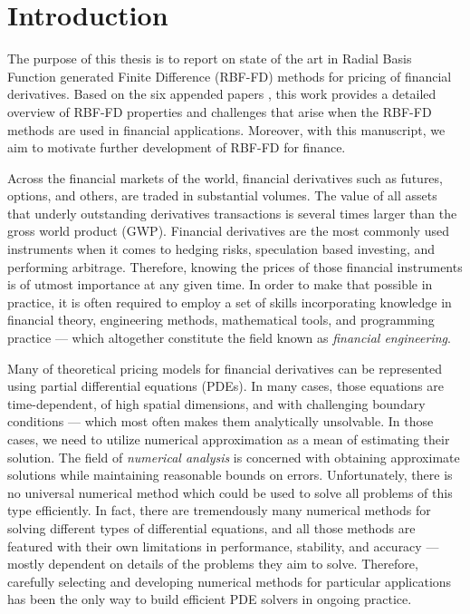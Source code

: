 \documentclass{UUThesisTemplate}
\begin{document}
\chapter{Introduction}
\label{ch:introduction}
\par The purpose of this thesis is to report on state of the art in Radial Basis Function generated Finite Difference (RBF-FD) methods for pricing of financial derivatives. Based on the six appended papers \cite{paper1,paper2,paper3,paper4,paper5,paper6}, this work provides a detailed overview of RBF-FD properties and challenges that arise when the RBF-FD methods are used in financial applications. Moreover, with this manuscript, we aim to motivate further development of RBF-FD for finance.
\par Across the financial markets of the world, financial derivatives such as futures, options, and others, are traded in substantial volumes. The value of all assets that underly outstanding derivatives transactions is several times larger than the gross world product (GWP). Financial derivatives are the most commonly used instruments when it comes to hedging risks, speculation based investing, and performing arbitrage. Therefore, knowing the prices of those financial instruments is of utmost importance at any given time. In order to make that possible in practice, it is often required to employ a set of skills incorporating knowledge in financial theory, engineering methods, mathematical tools, and programming practice --- which altogether constitute the field known as \emph{financial engineering}. 
\par Many of theoretical pricing models for financial derivatives can be represented using partial differential equations (PDEs). In many cases, those equations are time-dependent, of high spatial dimensions, and with challenging boundary conditions --- which most often makes them analytically unsolvable. In those cases, we need to utilize numerical approximation as a mean of estimating their solution. The field of \emph{numerical analysis} is concerned with obtaining approximate solutions while maintaining reasonable bounds on errors. Unfortunately, there is no universal numerical method which could be used to solve all problems of this type efficiently. In fact, there are tremendously many numerical methods for solving different types of differential equations, and all those methods are featured with their own limitations in performance, stability, and accuracy --- mostly dependent on details of the problems they aim to solve. Therefore, carefully selecting and developing numerical methods for particular applications has been the only way to build efficient PDE solvers in ongoing practice. 
\end{document}

